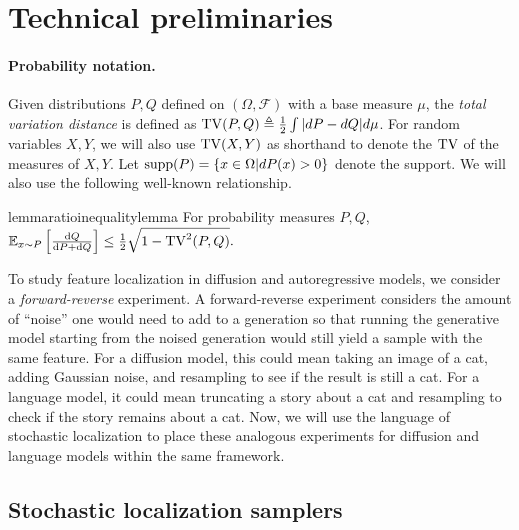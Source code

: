 \section{Technical preliminaries}\label{sec:prelims}

\paragraph{Probability notation.}
Given distributions $P,Q$ defined on $(\Omega,\mathcal{F})$ with a base measure $\mu$, the \emph{total variation distance} is defined as $\mathrm{TV}(P,Q) \triangleq \frac{1}{2}\int |dP-dQ| d\mu$. For random variables $X,Y$, we will also use $\mathrm{TV}(X,Y)$ as shorthand to denote the $\mathrm{TV}$ of the measures of $X,Y$. Let $\mathrm{supp}(P) = \{x \in \Omega|dP(x)>0\}$ denote the support.  We will also use the following well-known relationship.
\begin{restatable}{lemma}{ratioinequalitylemma}\label{lem:ratio_inequality}
For probability measures $P,Q$, $\mathbb{E}_{x \sim P} \left[\frac{\mathrm{d} Q}{\mathrm{d} P+\mathrm{d} Q} \right]\le \frac{1}{2}\sqrt{1-\mathrm{TV}^2(P,Q)}.$ 
\end{restatable} \vspace{-0.3em}
To study feature localization in diffusion and autoregressive models, we consider a \emph{forward-reverse} experiment. A forward-reverse experiment considers the amount of ``noise'' one would need to add to a generation so that running the generative model starting from the noised generation would still yield a sample with the same feature. For a diffusion model, this could mean taking an image of a cat, adding Gaussian noise, and resampling to see if the result is still a cat. For a language model, it could mean truncating a story about a cat and resampling to check if the story remains about a cat. Now, we will use the language of stochastic localization to place these analogous experiments for diffusion and language models within the same framework. \subsection{Stochastic localization samplers}\label{sec:stocloc}


